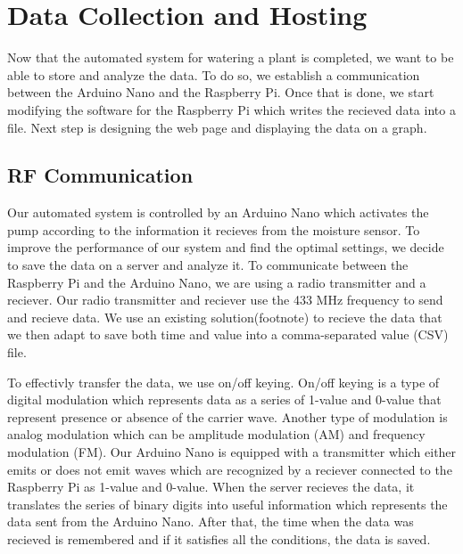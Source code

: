 \documentclass[conference]{IEEEtran}
\begin{document}
\section{Data Collection and Hosting}
\label{sec:collection}


Now that the automated system for watering a plant is completed, we want to be able to store and analyze the data.
To do so, we establish a communication between the Arduino Nano and the Raspberry Pi.
Once that is done, we start modifying the software for the Raspberry Pi which writes the recieved data into a file.
Next step is designing the web page and displaying the data on a graph.

\subsection{RF Communication}

Our automated system is controlled by an Arduino Nano which activates the pump according to the information it recieves from the moisture sensor.
To improve the performance of our system and find the optimal settings, we decide to save the data on a server and analyze it.
To communicate between the Raspberry Pi and the Arduino Nano, we are using a radio transmitter and a reciever.
Our radio transmitter and reciever use the 433 MHz frequency to send and recieve data.
We use an existing solution(footnote) to recieve the data that we then adapt to save both time and value into a comma-separated value (CSV) file.


To effectivly transfer the data, we use on/off keying.
On/off keying is a type of digital modulation which represents data as a series of 1-value and 0-value that represent presence or absence of the carrier wave.
Another type of modulation is analog modulation which can be amplitude modulation (AM) and frequency modulation (FM).
Our Arduino Nano is equipped with a transmitter which either emits or does not emit waves which are recognized by a reciever connected to the Raspberry Pi as 1-value and 0-value.
When the server recieves the data, it translates the series of binary digits into useful information which represents the data sent from the Arduino Nano.
After that, the time when the data was recieved is remembered and if it satisfies all the conditions, the data is saved.
\end{document}
